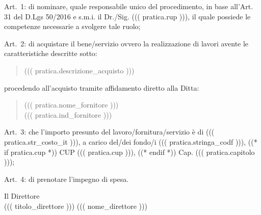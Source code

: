 \documentclass[a4paper,12pt]{letter}
\begin{document}
\begin{list}{VALUTATA}{}
\item[Art.~1:] di nominare, quale responsabile unico del procedimento, in base 
           all'Art. 31 del D.Lgs 50/2016 e s.m.i. il Dr./Sig. ((( pratica.rup ))),
           il quale possiede le competenze necessarie a svolgere tale ruolo; 
\item[Art.~2:] di acquistare il bene/servizio ovvero la realizzazione di lavori
        avente le caratteristiche descritte sotto:
\begin{quote}
            ((( pratica.descrizione_acquisto )))
\end{quote}

procedendo all'acquisto tramite affidamento diretto alla Ditta: 

\begin{quote}
((( pratica.nome_fornitore )))\\
((( pratica.ind_fornitore )))
\end{quote}

\item[Art.~3:] che l'importo presunto del lavoro/fornitura/servizio è di 
((( pratica.str_costo_it ))),
a carico del/dei fondo/i ((( pratica.stringa_codf ))), ((* if pratica.cup *)) CUP ((( pratica.cup ))), ((* endif *)) Cap. ((( pratica.capitolo ))); 
\end{list}
\begin{minipage}{\linewidth}
\begin{list}{VALUTATA}{}
\item[Art.~4:] di prenotare l'impegno di spesa. 
\end{list}
\vspace{10mm}

\begin{flushright}
\begin{minipage}[t]{6cm}
\begin{center}
Il Direttore \\
((( titolo_direttore ))) ((( nome_direttore )))
\end{center}
\end{minipage}
\end{flushright}
\end{minipage}
\end{document}
